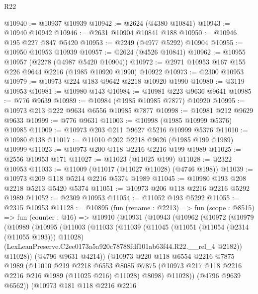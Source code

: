 \begin{lexlean}{R22}
\begin{coremodule}
@10940 := @10937 @10939
@10942 := @2624 (@4380 @10841)
@10943 := @10940 @10942
@10946 := @2631 @10904 @10841 @188
@10950 := @10946 @195 @227 @847 @5420
@10953 := @2249 (@4977 @5292) @10904
@10955 := @10950 @10953 @10939
@10957 := @2624 (@4526 @10841)
@10962 := @10955 @10957 (@2278 (@4987 @5420 @10904))
@10972 := @2971 @10953 @167 @155 @226 @9644 @2216 (@1985 @10920 @1990) @10922
@10973 := @2300 @10953
@10979 := @10973 @224 @183 @9642 @2218 @10920 @1990
@10980 := @3119 @10953
@10981 := @10980 @143
@10984 := @10981 @223 @9636 @9641
@10985 := @776 @9639
@10989 := @10984 (@1985 @10985 @7877) @10920
@10995 := @10973 @213 @222 @9634 @6556 @10985 @7877
@10998 := @10981 @212 @9629 @9633
@10999 := @776 @9631
@11003 := @10998 (@1985 @10999 @5376) @10985
@11009 := @10973 @203 @211 @9627 @5216 @10999 @5376
@11010 := @10980 @138
@11017 := @11010 @202 @2218 @9626 (@1985 @199 @1989) @10999
@11023 := @10973 @200 @118 @2216 @2216 @199 @1989
@11025 := @2556 @10953 @171
@11027 := @11023 (@11025 @199)
@11028 := @2322 @10953
@11033 := @11009 (@11017 (@11027 @11028) (@4746 @198))
@11039 := @10973 @209 @118 @5214 @2216 @5374 @1989
@11045 := @10980 @193 @208 @2218 @5213 @5420 @5374
@11051 := @10973 @206 @118 @2216 @2216 @5292 @1989
@11052 := @2309 @10953
@11054 := @11052 @193 @5292
@11055 := @2315 @10953
@11128 := @10895
    (fun (rename : @2213) =>
    fun (scope : @8515) =>
    fun (counter : @16) =>
    @10910
      (@10931
        (@10943
          (@10962
            (@10972
              (@10979
                (@10989
                  (@10995
                    (@11003
                      (@11033
                        (@11039
                          (@11045
                            (@11051 (@11054 (@2314 (@11055 @193))) @11028)
                            (LexLeanPreserve.C2ee0173a5a920c78788fdf101ab63f44.R22.__rel_4 @2182))
                          @11028))
                      (@4796 @9631 @4214))
                    (@10973
                      @220
                      @118
                      @6554
                      @2216
                      @7875
                      @1989
                      (@11010
                        @219
                        @2218
                        @6553
                        @8085
                        @7875
                        (@10973 @217 @118 @2216 @2216 @216 @1989 (@11025 @216) @11028)
                        @8098)
                      @11028))
                  (@4796 @9639 @6562))
                (@10973
                  @181
                  @118
                  @2216
                  @2216

\end{coremodule}
\end{lexlean}

